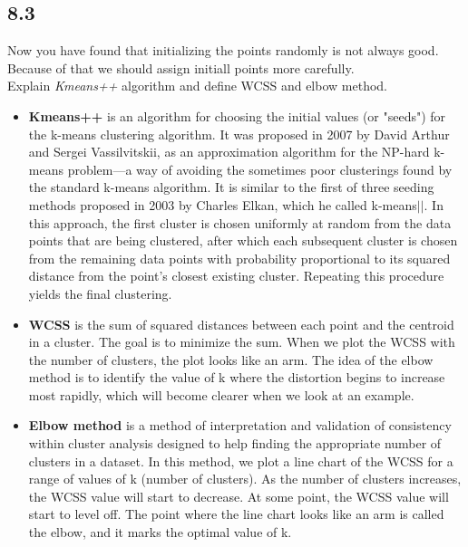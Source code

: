 \documentclass[12pt]{article}
\begin{document}
\subsection{8.3}
Now you have found that initializing the points randomly is not always good. Because of that we should assign initiall points more carefully.\\
Explain \textit{Kmeans++} algorithm and define WCSS and elbow method.
\begin{qsolve}[Clustering]
    \begin{itemize}
        \item \textbf{Kmeans++} is an algorithm for choosing the initial values (or "seeds") for the k-means clustering algorithm. It was proposed in 2007 by David Arthur and Sergei Vassilvitskii, as an approximation algorithm for the NP-hard k-means problem—a way of avoiding the sometimes poor clusterings found by the standard k-means algorithm. It is similar to the first of three seeding methods proposed in 2003 by Charles Elkan, which he called k-means$||$. In this approach, the first cluster is chosen uniformly at random from the data points that are being clustered, after which each subsequent cluster is chosen from the remaining data points with probability proportional to its squared distance from the point's closest existing cluster. Repeating this procedure yields the final clustering.\\
        \item \textbf{WCSS} is the sum of squared distances between each point and the centroid in a cluster. The goal is to minimize the sum. When we plot the WCSS with the number of clusters, the plot looks like an arm. The idea of the elbow method is to identify the value of k where the distortion begins to increase most rapidly, which will become clearer when we look at an example.\\
        \item \textbf{Elbow method} is a method of interpretation and validation of consistency within cluster analysis designed to help finding the appropriate number of clusters in a dataset. In this method, we plot a line chart of the WCSS for a range of values of k (number of clusters). As the number of clusters increases, the WCSS value will start to decrease. At some point, the WCSS value will start to level off. The point where the line chart looks like an arm is called the elbow, and it marks the optimal value of k.\\
    \end{itemize}
\end{qsolve}















\makeendpage
\end{document}
